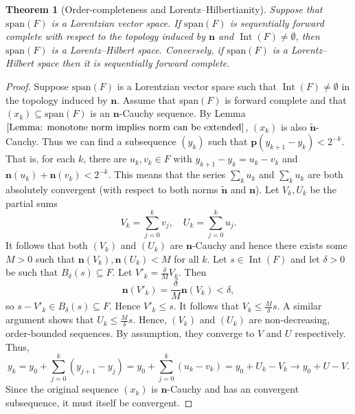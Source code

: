 \documentclass[a4paper,11pt]{article}
\numberwithin{equation}{section}
\theoremstyle{definition}
\theoremstyle{plain}
\newtheorem{Theorem}[Definition]{Theorem}
\newcommand{\spn}{\mathrm{span}}
\DeclareMathOperator{\Int}{Int}
\begin{document}
\begin{Theorem}[Order-completeness and Lorentz--Hilbertianity]\label{Theorem: Sequential foward completeness and Lorentz Hilbert}
Suppose that $\spn(F)$ is a Lorentzian vector space. If $\spn(F)$ is sequentially forward complete with respect to the topology induced by $\mathbf n$ and $\Int(F) \neq \emptyset$, then $\spn(F)$ is a Lorentz--Hilbert space. Conversely, if $\spn(F)$ is a Lorentz--Hilbert space then it is sequentially forward complete.
\end{Theorem}
\begin{proof}
    Suppose $\spn(F)$ is a Lorentzian vector space such that $\Int(F) \neq \emptyset$ in the topology induced by $\mathbf n$. Assume that $\spn(F)$ is forward complete and that $(x_{k}) \subseteq \spn(F)$ is an $\mathbf n$-Cauchy sequence. By Lemma $\ref{Lemma: monotone norm implies norm can be extended}$, $(x_{k})$ is also $\tilde{\mathbf{n}}$-Cauchy. Thus we can find a subsequence $(y_{k})$ such that $\mathbf p(y_{k + 1} - y_{k}) < 2^{-k}$. That is, for each $k$, there are $u_{k}, v_{k} \in F$ with $y_{k + 1} - y_{k} = u_{k} - v_{k}$ and 
    $\mathbf n(u_{k}) + \mathbf n(v_{k}) < 2^{-k}$. This means that the series $\sum_{k} u_{k}$ and $\sum_{k} u_{k}$ are both absolutely convergent (with respect to both norms $\tilde{\mathbf{n}}$ and $\mathbf n$). Let $V_{k}, U_{k}$ be the partial sums
    $$V_{k} = \sum_{j = 0}^{k}v_{j}, \quad U_{k} = \sum_{j = 0}^{k}u_{j}.$$
    It follows that both $(V_{k})$ and $(U_{k})$ are $\mathbf n$-Cauchy and hence there exists some $M > 0$ such that $\mathbf n(V_{k}), \mathbf n(U_{k}) < M$ for all $k$. Let $s \in \Int(F)$ and let $\delta > 0$ be such that $B_{\delta}(s) \subseteq F$. Let $V'_{k} = \frac{\delta}{M}V_{k}$. Then
    $$\mathbf n(V'_{k}) = \frac{\delta}{M}\mathbf n(V_{k}) < \delta,$$
    so $s - V'_{k} \in B_{\delta}(s) \subseteq F$. Hence $V'_{k} \leq s$. It follows that $V_{k} \leq \frac{M}{\delta} s$. A similar argument shows that $U_{k} \leq \frac{M}{\delta} s$. Hence, $(V_{k})$ and $(U_{k})$ are non-decreasing, order-bounded sequences. By assumption, they converge to $V$ and $U$ respectively. Thus,
    $$y_{k} = y_{0} + \sum_{j = 0}^{k}(y_{j + 1} - y_{j}) = y_{0} + \sum_{j = 0}^{k}(u_{k} - v_{k}) = y_{0} + U_{k} - V_{k} \to y_{0} + U - V.$$
    Since the original sequence $(x_{k})$ is $\mathbf n$-Cauchy and has an convergent subsequence, it must itself be convergent. 


\end{proof}
\end{document}
